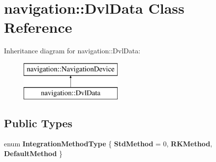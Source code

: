 \hypertarget{classnavigation_1_1DvlData}{}\section{navigation\+:\+:Dvl\+Data Class Reference}
\label{classnavigation_1_1DvlData}
Inheritance diagram for navigation\+:\+:Dvl\+Data\+:\begin{figure}[H]
\begin{center}
\leavevmode
\includegraphics[height=2.000000cm]{classnavigation_1_1DvlData}
\end{center}
\end{figure}
\subsection*{Public Types}
\begin{DoxyCompactItemize}
\item 
\mbox{\label{classnavigation_1_1DvlData_ac24d2ec36fda2e666c6c1d99ea3b8f63}} 
enum {\bfseries Integration\+Method\+Type} \{ {\bfseries Std\+Method} = 0, 
{\bfseries R\+K\+Method}, 
{\bfseries Default\+Method}
 \}
\end{DoxyCompactItemize}
